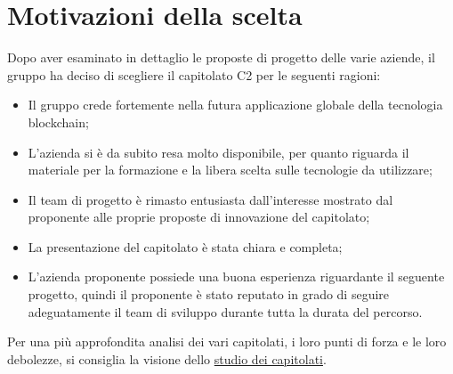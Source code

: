 \section{Motivazioni della scelta}\label{section:motivazioni}

Dopo aver esaminato in dettaglio le proposte di progetto delle varie aziende, il gruppo ha deciso di scegliere il capitolato C2 per le seguenti ragioni:
\begin{itemize}
    \item Il gruppo crede fortemente nella futura applicazione globale della tecnologia blockchain;
    \item L'azienda si è da subito resa molto disponibile, per quanto riguarda il materiale per la formazione e la libera scelta sulle tecnologie da utilizzare;
    \item Il team di progetto è rimasto entusiasta dall'interesse mostrato dal proponente alle proprie proposte di innovazione del capitolato;
    \item La presentazione del capitolato è stata chiara e completa;
    \item L'azienda proponente possiede una buona esperienza riguardante il seguente progetto, quindi il proponente è stato reputato in grado di seguire adeguatamente il team di sviluppo durante tutta la durata del percorso.
\end{itemize}
Per una più approfondita analisi dei vari capitolati, i loro punti di forza e le loro debolezze, 
si consiglia la visione dello \href{https://yakuzaishi-swe.github.io/docs/studio_capitolati.pdf}{studio dei capitolati}.